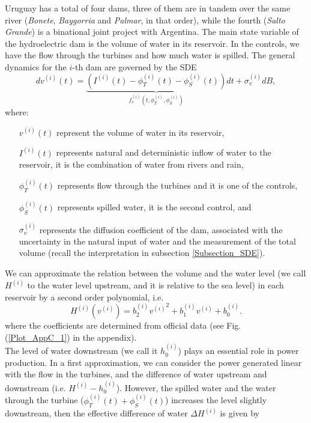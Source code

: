 Uruguay has a total of four dams, three of them are in tandem over the same river (\textit{Bonete}, \textit{Baygorria} and \textit{Palmar}, in that order), while the fourth (\textit{Salto Grande}) is a binational joint project with Argentina. The main state variable of the hydroelectric dam is the volume of water in its reservoir. In the controls, we have the flow through the turbines and how much water is spilled. The general dynamics for the $i$-th dam are governed by the SDE
\begin{equation}
dv^{(i)}(t)=\underbrace{\left(I^{(i)}(t)-\phi_T^{(i)}(t)-\phi_S^{(i)}(t)\right)}_{f_v^{(i)}\left(t,\phi_T^{(i)},\phi_S^{(i)}\right)}dt+\sigma_v^{(i)}dB,
\label{Volume}
\end{equation}
where:
\begin{enumerate}

\item[$v^{(i)}(t)$] represent the volume of water in its reservoir,

\item[$I^{(i)}(t)$] represents natural and deterministic inflow of water to the reservoir, it is the combination of water from rivers and rain,

\item[$\phi_T^{(i)}(t)$] represents flow through the turbines and it is one of the controls,

\item[$\phi_S^{(i)}(t)$] represents spilled water, it is the second control, and

\item[$\sigma_v^{(i)}$] represents the diffusion coefficient of the dam, associated with the uncertainty in the natural input of water and the measurement of the total volume (recall the interpretation in subsection \ref{Subsection_SDE}).

\end{enumerate}
We can approximate the relation between the volume and the water level (we call $H^{(i)}$ to the water level upstream, and it is relative to the sea level) in each reservoir by a second order polynomial, i.e.
\begin{equation*}
H^{(i)}(v^{(i)})=b^{(i)}_2{v^{(i)}}^2+b^{(i)}_1{v^{(i)}}+b^{(i)}_0.
\end{equation*}
where the coefficients are determined from official data (see Fig. (\ref{Plot_AppC_1}) in the appendix).\\
The level of water downstream (we call it $h_0^{(i)}$) plays an essential role in power production. In a first approximation, we can consider the power generated linear with the flow in the turbines, and the difference of water upstream and downstream (i.e. $H^{(i)}-h_0^{(i)}$). However, the spilled water and the water through the turbine ($\phi_T^{(i)}(t)+\phi_S^{(i)}(t)$) increases the level slightly downstream, then the effective difference of water $\Delta H^{(i)}$ is given by
